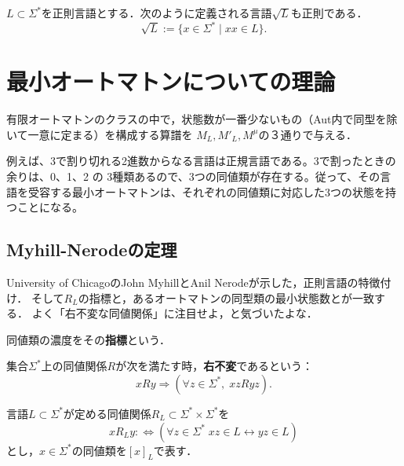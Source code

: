 \documentclass[uplatex, dvipdfmx]{jsreport}
\begin{document}
\begin{theorem}
    $L\subset\Sigma^*$を正則言語とする．次のように定義される言語$\sqrt{L}$も正則である．
    \[\sqrt{L}:=\{x\in\Sigma^*\mid xx\in L\}.\]
\end{theorem}

\section{最小オートマトンについての理論}

\begin{tcolorbox}[colframe=ForestGreen, colback=ForestGreen!10!white, breakable]
    有限オートマトンのクラスの中で，状態数が一番少ないもの（Aut内で同型を除いて一意に定まる）を構成する算譜を
    $M_L,M'_L,M^\mu$の３通りで与える．
\end{tcolorbox}

\begin{example}
    例えば、3で割り切れる2進数からなる言語は正規言語である。3で割ったときの余りは、0、1、2 の 3種類あるので、3つの同値類が存在する。従って、その言語を受容する最小オートマトンは、それぞれの同値類に対応した3つの状態を持つことになる。
\end{example}

\subsection{Myhill-Nerodeの定理}

\begin{tcolorbox}[colframe=ForestGreen, colback=ForestGreen!10!white, breakable]
    University of ChicagoのJohn MyhillとAnil Nerodeが示した，正則言語の特徴付け．\cite{Nerode}
    そして$R_L$の指標と，あるオートマトンの同型類の最小状態数とが一致する．
    よく「右不変な同値関係」に注目せよ，と気づいたよな．
\end{tcolorbox}

\begin{definition}[index]
    同値類の濃度をその\textbf{指標}という．
\end{definition}

\begin{definition}
    集合$\Sigma^*$上の同値関係$R$が次を満たす時，\textbf{右不変}であるという：
    \[ xRy\Rightarrow (\forall z\in\Sigma^*,\;xzRyz). \]
\end{definition}

\begin{definition}
    言語$L\subset\Sigma^*$が定める同値関係$R_L\subset\Sigma^*\times\Sigma^*$を
    \[ xR_Ly:\Leftrightarrow (\forall z\in\Sigma^*\;xz\in L\leftrightarrow yz\in L) \]
    とし，$x\in\Sigma^*$の同値類を$[x]_L$で表す．
\end{definition}
\end{document}
